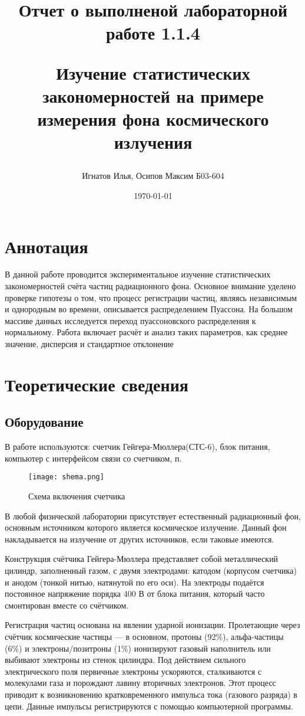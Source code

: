 \documentclass[a4paper]{article}
\title{Отчет о выполненой лабораторной работе 1.1.4

Изучение статистических закономерностей на примере измерения фона космического излучения
}
\author{Игнатов Илья, Осипов Максим Б03-604}
\date{\today}
\begin{document}
\maketitle
\newpage


\section{Аннотация}
В данной работе проводится экспериментальное изучение статистических закономерностей счёта частиц радиационного фона. Основное внимание уделено проверке гипотезы о том, что процесс регистрации частиц, являясь независимым и однородным во времени, описывается распределением Пуассона. На большом массиве данных исследуется переход пуассоновского распределения к нормальному. Работа включает расчёт и анализ таких параметров, как среднее значение, дисперсия и стандартное отклонение 



\section{Теоретические сведения}
\subsection{Оборудование}
В работе используются: счетчик Гейгера-Мюллера(СТС-6), блок питания, компьютер с интерфейсом связи со счетчиком, п.
\begin{wrapfigure}{R}{.3\textwidth}
\centering
\texttt{[image: shema.png]}
\caption{Схема включения счетчика}
\end{wrapfigure}

В любой физической лаборатории присутствует естественный радиационный фон, основным источником которого является космическое излучение. Данный фон накладывается на излучение от других источников, если таковые имеются.

Конструкция счётчика Гейгера-Мюллера представляет собой металлический цилиндр, заполненный газом, с двумя электродами: катодом (корпусом счетчика) и анодом (тонкой нитью, натянутой по его оси). На электроды подаётся постоянное напряжение порядка 400 В от блока питания, который часто смонтирован вместе со счётчиком.

Регистрация частиц основана на явлении ударной ионизации. Пролетающие через счётчик космические частицы — в основном, протоны (92\%), альфа-частицы
(6\%) и электроны/позитроны (1\%) ионизируют газовый наполнитель или выбивают электроны из стенок цилиндра. Под действием сильного электрического поля первичные электроны ускоряются, сталкиваются с молекулами газа и порождают лавину вторичных электронов. Этот процесс приводит к возникновению кратковременного импульса тока (газового разряда) в цепи. Данные импульсы регистрируются с помощью компьютерной программы.
\end{document}

